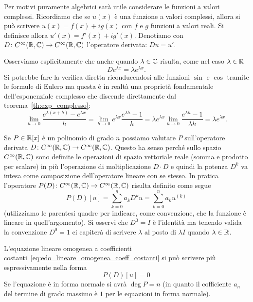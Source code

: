 Per motivi puramente algebrici sarà utile considerare le funzioni a valori complessi.
Ricordiamo che se $u(x)$ è una funzione a valori complessi,
allora si può scrivere $u(x) = f(x) + i g(x)$ con $f$ e $g$ funzioni a valori reali.
Si definisce allora $u'(x) = f'(x) + ig'(x)$.
Denotiamo con $D \colon C^\infty(\mathbb R, \mathbb C)\to C^\infty(\mathbb R, \mathbb C)$ l'operatore derivata: $D u = u'$.

Osserviamo esplicitamente che anche quando $\lambda \in \mathbb C$ risulta,
come nel caso $\lambda\in \mathbb R$
\begin{equation}\label{eq:499375}
  D e^{\lambda x} = \lambda e^{\lambda x}.
\end{equation}
Si potrebbe fare la verifica diretta riconducendosi alle funzioni $\sin$ e $\cos$
tramite le formule di Eulero ma questa
è in realtà una proprietà fondamentale dell'esponenziale complesso
che discende direttamente dal teorema~\ref{th:exp_complesso}:
\[
 \lim_{h\to 0} \frac{e^{\lambda(x+h)}-e^{\lambda x}}{h}
 = \lim_{h\to 0} e^{\lambda x}\frac{e^{\lambda h}-1}{h}
 = \lambda e^{\lambda x} \lim_{h\to 0}\frac{e^{\lambda h}-1}{\lambda h}
 = \lambda e^{\lambda x}.
\]

Se $P\in \mathbb R[x]$ è un polinomio di grado $n$
possiamo valutare $P$ sull'operatore
derivata $D\colon C^\infty(\mathbb R,\mathbb C)\to C^\infty(\mathbb R,\mathbb C)$.
Questo ha senso perché sullo spazio $C^\infty(\mathbb R,\mathbb C)$
sono definite le operazioni di spazio vettoriale reale
(somma e prodotto per scalare) in più l'operazione
di moltiplicazione $D\cdot D$ e quindi la potenza
$D^k$ va intesa come composizione dell'operatore
lineare con se stesso.
In pratica l'operatore
$P(D)\colon C^\infty(\mathbb R,\mathbb C) \to C^\infty(\mathbb R,\mathbb C)$
risulta definito come segue
\[
  P(D)[u] = \sum_{k=0}^n a_k D^k u = \sum_{k=0}^n a_k u^{(k)}
\]
(utilizziamo le parentesi quadre per indicare, come convenzione,
che la funzione è lineare in quell'argomento).
Si osservi che $D^0 = I$ è l'identità ma tenendo valida
la convenzione $D^0 = 1$ ci capiterà di scrivere
$\lambda$ al posto di $\lambda I$ quando $\lambda\in \mathbb R$.

L'equazione lineare omogenea a coefficienti costanti~\eqref{eq:edo_lineare_omogenea_coeff_costanti}
si può scrivere più espressivamente nella forma
\[
  P(D)[u] = 0
\]
Se l'equazione è in forma normale si avrà $\deg P = n$
(in quanto il cofficiente $a_n$ del termine di grado massimo è $1$ per le
equazioni in forma normale).

